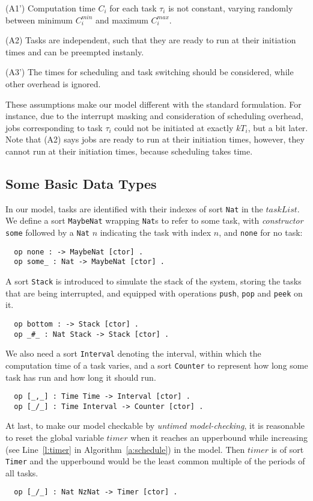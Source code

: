 \documentclass{llncs}
\begin{document}
(A1') Computation time $C_i$ for each task $\tau_i$ is not constant,
varying randomly between minimum $C^{min}_i$ and maximum $C^{max}_i$.

(A2) Tasks are independent, such that they are ready to run at their
initiation times and can be preempted instanly.

(A3') The times for scheduling and task switching should be
considered, while other overhead is ignored.

These assumptions make our model different with the standard
formulation. For instance, due to the interrupt masking and
consideration of scheduling overhead, jobs corresponding to task
$\tau_i$ could not be initiated at exactly $kT_i$, but a bit later.
Note that (A2) says jobs are ready to run at their initiation times,
however, they cannot run at their initiation times, because scheduling
takes time.

\subsection{Some Basic Data Types}
In our model, tasks are identified with their indexes of sort
\verb|Nat| in the $taskList$. We define a sort \verb|MaybeNat|
wrapping \verb|Nat|s to refer to some task, with \emph{constructor}
\verb|some| followed by a \verb|Nat| $n$ indicating the task with
index $n$, and \verb|none| for no task:
\begin{verbatim}
  op none : -> MaybeNat [ctor] .
  op some_ : Nat -> MaybeNat [ctor] .
\end{verbatim}

A sort \verb|Stack| is introduced to simulate the stack of the system,
storing the tasks that are being interrupted, and equipped with
operations \verb|push|, \verb|pop| and \verb|peek| on it.
\begin{verbatim}
  op bottom : -> Stack [ctor] .
  op _#_ : Nat Stack -> Stack [ctor] .
\end{verbatim}

We also need a sort \verb|Interval| denoting the interval, within
which the computation time of a task varies, and a sort \verb|Counter|
to represent how long some task has run and how long it should run.
\begin{verbatim}
  op [_,_] : Time Time -> Interval [ctor] .
  op [_/_] : Time Interval -> Counter [ctor] .
\end{verbatim}

At last, to make our model checkable by \emph{untimed model-checking},
it is reasonable to reset the global variable $timer$ when it reaches
an upperbound while increasing (see Line~\ref{l:timer} in
Algorithm~\ref{a:schedule}) in the model. Then $timer$ is of sort
\verb|Timer| and the upperbound would be the least common multiple of
the periods of all tasks.
\begin{verbatim}
  op [_/_] : Nat NzNat -> Timer [ctor] .
\end{verbatim}
\end{document}
